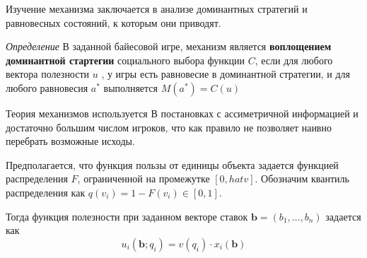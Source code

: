 Изучение механизма заключается в анализе доминантных стратегий и равновесных состояний, к которым они приводят. 


\textit{Определение} В заданной байесовой игре, механизм является \textbf{воплощением доминантной стартегии} 
социального выбора функции $C$, если для любого вектора полезности $u$ , 
у игры есть равновесие в доминантной стратегии, и для любого равновесия $a^*$ выполняется $M(a^*) = C(u)$


Теория механизмов используется В
постановках с ассиметричной информацией
и достаточно большим числом игроков, что
как правило не позволяет наивно перебрать возможные исходы.


Предполагается, что функция пользы
от единицы объекта задается 
функцией распределения $F$,
ограниченной на промежутке $\left[0,
hat{v}\right]$. Обозначим квантиль распределения 
как $q(v_i) = 1 - F(v_i) \in \left[0,1\right]$.

Тогда функция полезности при заданном векторе ставок 
$\mathbf{b} = \left(b_1, \dots, b_n\right)$
задается как 
$$
    u_i(\mathbf{b};q_i) = v(q_i) \cdot x_i(\mathbf{b})
$$




